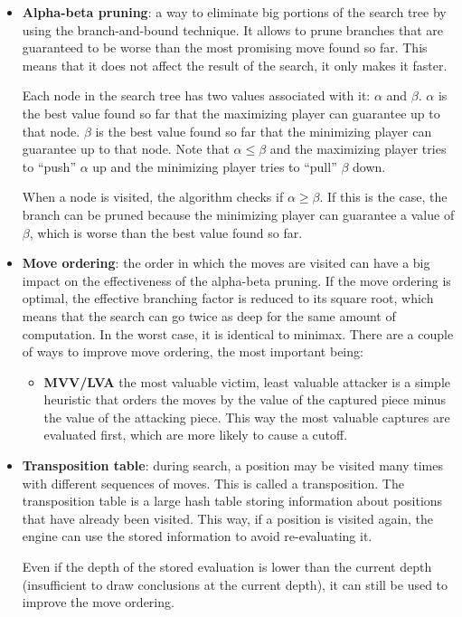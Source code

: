 \begin{itemize}
\item \textbf{Alpha-beta pruning}: a way to eliminate big portions of the search tree by using the branch-and-bound technique. It allows to prune branches that are guaranteed to be worse than the most promising move found so far. This means that it does not affect the result of the search, it only makes it faster.

Each node in the search tree has two values associated with it: $\alpha$ and $\beta$. $\alpha$ is the best value found so far that the maximizing player can guarantee up to that node. $\beta$ is the best value found so far that the minimizing player can guarantee up to that node. Note that $\alpha \le \beta$ and the maximizing player tries to \enquote{push} $\alpha$ up and the minimizing player tries to \enquote{pull} $\beta$ down.

When a node is visited, the algorithm checks if $\alpha \ge \beta$. If this is the case, the branch can be pruned because the minimizing player can guarantee a value of $\beta$, which is worse than the best value found so far.

\item \textbf{Move ordering}: the order in which the moves are visited can have a big impact on the effectiveness of the alpha-beta pruning. If the move ordering is optimal, the effective branching factor is reduced to its square root, which means that the search can go twice as deep for the same amount of computation. In the worst case, it is identical to minimax. There are a couple of ways to improve move ordering, the most important being:
\begin{itemize}
\item \textbf{MVV/LVA} the most valuable victim, least valuable attacker is a simple heuristic that orders the moves by the value of the captured piece minus the value of the attacking piece. This way the most valuable captures are evaluated first, which are more likely to cause a cutoff.
\end{itemize}

\item \textbf{Transposition table}: during search, a position may be visited many times with different sequences of moves. This is called a transposition. The transposition table is a large hash table storing information about positions that have already been visited. This way, if a position is visited again, the engine can use the stored information to avoid re-evaluating it.

Even if the depth of the stored evaluation is lower than the current depth (insufficient to draw conclusions at the current depth), it can still be used to improve the move ordering.

\end{itemize}

